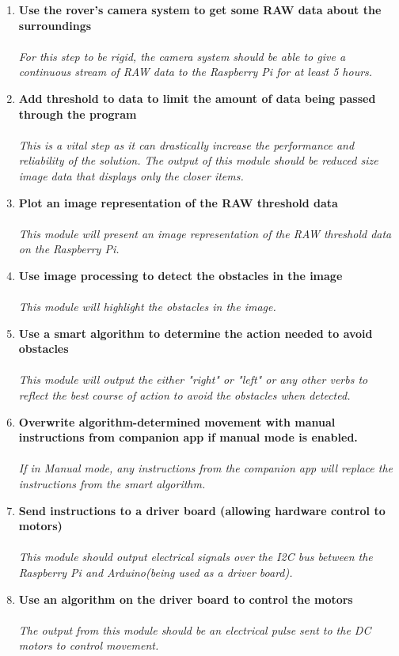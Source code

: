 \documentclass[11pt]{report}
\begin{document}
		\begin{enumerate}
			\item{\textbf{Use the rover's camera system to get some RAW data about the surroundings}}\\\\ \emph{For this step to be rigid, the camera system should be able to give a continuous stream of RAW data to the Raspberry Pi for at least 5 hours.}
			\item{\textbf{Add threshold to data to limit the amount of data being passed through the program}}\\\\ \emph{This is a vital step as it can drastically increase the performance and reliability of the solution. The output of this module should be reduced size image data that displays only the closer items.}
			\item{\textbf{Plot an image representation of the RAW threshold data}}\\\\ \emph{This module will present an image representation of the RAW threshold data on the Raspberry Pi.}
			\item{\textbf{Use image processing to detect the obstacles in the image}}\\\\ \emph{This module will highlight the obstacles in the image.}
			\item{\textbf{Use a smart algorithm to determine the action needed to avoid obstacles}}\\\\ \emph{This module will output the either "right" or "left" or any other verbs to reflect the best course of action to avoid the obstacles when detected.}
			\item{\textbf{Overwrite algorithm-determined movement with manual instructions from companion app if manual mode is enabled.}}\\\\ \emph{If in Manual mode, any instructions from the companion app will replace the instructions from the smart algorithm.}
			\item{\textbf{Send instructions to a driver board (allowing hardware control to motors)}}\\\\ \emph{This module should output electrical signals over the I2C bus between the Raspberry Pi and Arduino(being used as a driver board).}
			\item{\textbf{Use an algorithm on the driver board to control the motors}}\\\\ \emph{The output from this module should be an electrical pulse sent to the DC motors to control movement.}

\end{enumerate}
\end{document}
